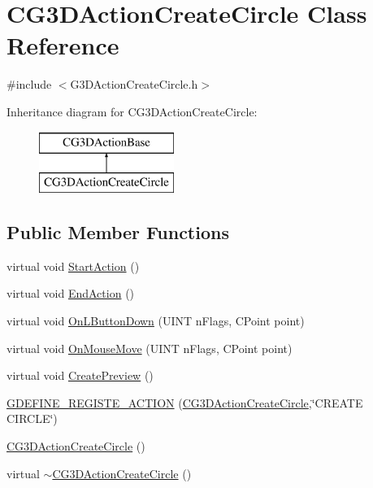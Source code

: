 \hypertarget{class_c_g3_d_action_create_circle}{}\section{C\+G3\+D\+Action\+Create\+Circle Class Reference}
\label{class_c_g3_d_action_create_circle}


{\ttfamily \#include $<$G3\+D\+Action\+Create\+Circle.\+h$>$}

Inheritance diagram for C\+G3\+D\+Action\+Create\+Circle\+:\begin{figure}[H]
\begin{center}
\leavevmode
\includegraphics[height=2.000000cm]{class_c_g3_d_action_create_circle}
\end{center}
\end{figure}
\subsection*{Public Member Functions}
\begin{DoxyCompactItemize}
\item 
virtual void \hyperlink{class_c_g3_d_action_create_circle_ab4ea578c57427132c3e3180fa9859ec0}{Start\+Action} ()
\item 
virtual void \hyperlink{class_c_g3_d_action_create_circle_a3190c83be546099c1f661c9d15bd34bc}{End\+Action} ()
\item 
virtual void \hyperlink{class_c_g3_d_action_create_circle_a925e4e1a26f4cc423c3a587ca1e68262}{On\+L\+Button\+Down} (U\+I\+N\+T n\+Flags, C\+Point point)
\item 
virtual void \hyperlink{class_c_g3_d_action_create_circle_a6daa2743ad9450e4ea0c074221bb7450}{On\+Mouse\+Move} (U\+I\+N\+T n\+Flags, C\+Point point)
\item 
virtual void \hyperlink{class_c_g3_d_action_create_circle_a14f6e3392ba347b97d98b303085ea293}{Create\+Preview} ()
\item 
\hyperlink{class_c_g3_d_action_create_circle_aa922b092aa5c82574b34a48ec5de67e3}{G\+D\+E\+F\+I\+N\+E\+\_\+\+R\+E\+G\+I\+S\+T\+E\+\_\+\+A\+C\+T\+I\+O\+N} (\hyperlink{class_c_g3_d_action_create_circle}{C\+G3\+D\+Action\+Create\+Circle},\char`\"{}C\+R\+E\+A\+T\+E C\+I\+R\+C\+L\+E\char`\"{})
\item 
\hyperlink{class_c_g3_d_action_create_circle_a2f22912e220be884fda9eaa468a37dfa}{C\+G3\+D\+Action\+Create\+Circle} ()
\item 
virtual \hyperlink{class_c_g3_d_action_create_circle_a7592214c9444b985d0d1b977f350cd6a}{$\sim$\+C\+G3\+D\+Action\+Create\+Circle} ()
\end{DoxyCompactItemize}
